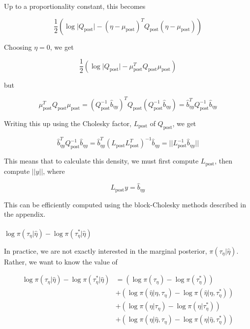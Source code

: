 \documentclass[
  letterpaper,
  DIV=11,
  numbers=noendperiod]{scrartcl}
\makeatletter
\let\oldparagraph\paragraph
\renewcommand{\paragraph}{
    \@ifstar
      \xxxParagraphStar
      \xxxParagraphNoStar
  }
\newcommand{\xxxParagraphStar}[1]{\oldparagraph*{#1}\mbox{}}
\newcommand{\xxxParagraphNoStar}[1]{\oldparagraph{#1}\mbox{}}
\makeatother
\begin{document}
Up to a proportionality constant, this becomes

\[
\frac12\left(\log\vert Q_\text{post}\vert - (\eta - \mu_\text{post})^TQ_\text{post}(\eta - \mu_\text{post}) \right)
\]

Choosing \(\eta = 0\), we get

\[
\frac12\left(\log\vert Q_\text{post}\vert - \mu_\text{post}^TQ_\text{post}\mu_\text{post} \right)
\]

but

\[
\mu_\text{post}^TQ_\text{post}\mu_\text{post} = (Q_\text{post}^{-1}\hat b_{\eta y})^T Q_\text{post}(Q_\text{post}^{-1}\hat b_{\eta y}) = \hat b_{\eta y}^TQ_\text{post}^{-1}\hat b_{\eta y}
\]

Writing this up using the Cholesky factor, \(L_\text{post}\) of
\(Q_\text{post}\), we get

\[
\hat b_{\eta y}^TQ_\text{post}^{-1}\hat b_{\eta y} = \hat b_{\eta y}^T(L_\text{post} L_\text{post}^T)^{-1}\hat b_{\eta y} = \vert\vert L_\text{post}^{-1}\hat b_{\eta y}\vert\vert
\]

This means that to calculate this density, we must first compute
\(L_\text{post}\), then compute \(\vert\vert y\vert \vert\), where

\[
L_\text{post}y = \hat b_{\eta y}
\]

This can be efficiently computed using the block-Cholesky methods
described in the appendix.

\paragraph{\texorpdfstring{\(\log \pi(\tau_\eta \vert \hat \eta) - \log \pi(\tau_\eta^* \vert \hat \eta)\)}{\textbackslash log \textbackslash pi(\textbackslash tau\_\textbackslash eta \textbackslash vert \textbackslash hat \textbackslash eta) - \textbackslash log \textbackslash pi(\textbackslash tau\_\textbackslash eta\^{}* \textbackslash vert \textbackslash hat \textbackslash eta)}}\label{log-pitau_eta-vert-hat-eta---log-pitau_eta-vert-hat-eta}

In practice, we are not exactly interested in the marginal posterior,
\(\pi(\tau_\eta \vert \hat \eta)\). Rather, we want to know the value of

\[
\begin{aligned}
\log \pi(\tau_\eta \vert \hat \eta) - \log \pi(\tau_\eta^* \vert \hat \eta) &= 
\left( \log\pi(\tau_\eta) - \log\pi(\tau_\eta^*) \right)  \\ 
&+\left( \log\pi(\hat \eta \vert \eta, \tau_\eta) - \log\pi(\hat \eta \vert \eta, \tau_\eta^*) \right) \\
&+ \left( \log\pi(\eta \vert \tau_\eta) - \log \pi(\eta \vert \tau_\eta^*) \right) \\
&+ \left( \log \pi(\eta \vert \hat \eta, \tau_\eta) - \log \pi(\eta \vert \hat \eta, \tau_\eta^*) \right)
\end{aligned}
\]
\end{document}
